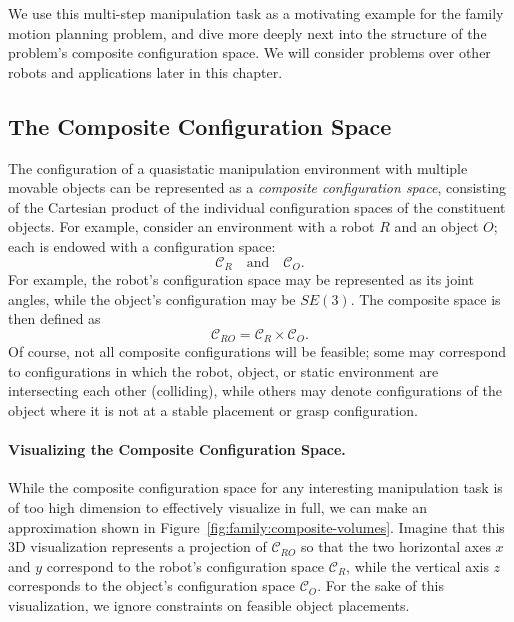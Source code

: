 We use this multi-step manipulation task as a motivating example
for the family motion planning problem,
and dive more deeply next into the structure of the problem's
composite configuration space.
We will consider problems over other robots and applications
later in this chapter.

\subsection{The Composite Configuration Space}

The configuration of a quasistatic manipulation environment
with multiple movable objects can be represented as a
\emph{composite configuration space},
consisting of the Cartesian product of the individual configuration
spaces of the constituent objects.
For example,
consider an environment with a robot $R$ and an object $O$;
each is endowed with a configuration space:
\begin{equation}
   \mathcal{C}_R \quad\mbox{and}\quad \mathcal{C}_O.
\end{equation}
For example,
the robot's configuration space may be represented as its joint angles,
while the object's configuration may be $SE(3)$.
The composite space is then defined as
\begin{equation}
   \mathcal{C}_{RO} = \mathcal{C}_R \times \mathcal{C}_O.
\end{equation}
Of course,
not all composite configurations will be feasible;
some may correspond to configurations in which the robot,
object, or static environment are intersecting each other (colliding),
while others may denote configurations of the object where it is
not at a stable placement or grasp configuration.

\paragraph{Visualizing the Composite Configuration Space.}
While the composite configuration space for any interesting
manipulation task
is of too high dimension to effectively visualize in full,
we can make an approximation shown
in Figure~\ref{fig:family:composite-volumes}.
Imagine that this 3D visualization represents a projection of
$\mathcal{C}_{RO}$
so that the two horizontal axes $x$ and $y$ correspond to
the robot's configuration space $\mathcal{C}_{R}$,
while the vertical axis $z$ corresponds to the object's
configuration space $\mathcal{C}_{O}$.
For the sake of this visualization,
we ignore constraints on feasible object placements.

